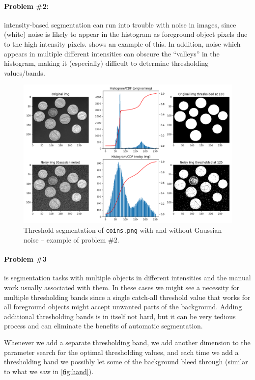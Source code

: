 \paragraph{Problem \#2:} intensity-based segmentation can run into trouble with
noise in images, since (white) noise is likely to appear in the histogram as
foreground object pixels due to the high intensity pixels.
 shows an example of this. In addition, noise
which appears in multiple different intensities can obscure the ``valleys'' in
the histogram, making it (especially) difficult to determine thresholding
values/bands.

\begin{figure}[H]
  \centering
  \includegraphics[width=\textwidth]{figures/task_5_1_example2.png}
  \caption{Threshold segmentation of \texttt{coins.png} with and without
  Gaussian noise -- example of problem \#2.}
  \label{fig:5_1_example2}
\end{figure}


\paragraph{Problem \#3} is segmentation tasks with multiple objects in
different intensities and the manual work usually associated with them. In these
cases we might see a necessity for multiple thresholding bands since a single
catch-all threshold value that works for all foreground objects might accept
unwanted parts of the background. Adding additional thresholding bands is in
itself not hard, but it can be very tedious process and can eliminate the
benefits of automatic segmentation.

Whenever we add a separate thresholding band, we add another dimension to the
parameter search for the optimal thresholding values, and each time we add a
thresholding band we possibly let some of the background bleed through (similar
to what we saw in \cref{fig:hand}).

